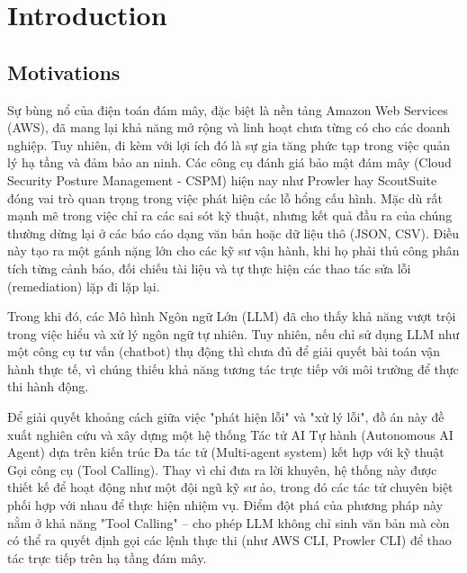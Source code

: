 \chapter{Introduction}

\section{Motivations}
Sự bùng nổ của điện toán đám mây, đặc biệt là nền tảng Amazon Web Services (AWS), đã mang lại khả năng mở rộng và linh hoạt chưa từng có cho các doanh nghiệp. Tuy nhiên, đi kèm với lợi ích đó là sự gia tăng phức tạp trong việc quản lý hạ tầng và đảm bảo an ninh. Các công cụ đánh giá bảo mật đám mây (Cloud Security Posture Management - CSPM) hiện nay như Prowler hay ScoutSuite đóng vai trò quan trọng trong việc phát hiện các lỗ hổng cấu hình. Mặc dù rất mạnh mẽ trong việc chỉ ra các sai sót kỹ thuật, nhưng kết quả đầu ra của chúng thường dừng lại ở các báo cáo dạng văn bản hoặc dữ liệu thô (JSON, CSV). Điều này tạo ra một gánh nặng lớn cho các kỹ sư vận hành, khi họ phải thủ công phân tích từng cảnh báo, đối chiếu tài liệu và tự thực hiện các thao tác sửa lỗi (remediation) lặp đi lặp lại.

Trong khi đó, các Mô hình Ngôn ngữ Lớn (LLM) đã cho thấy khả năng vượt trội trong việc hiểu và xử lý ngôn ngữ tự nhiên. Tuy nhiên, nếu chỉ sử dụng LLM như một công cụ tư vấn (chatbot) thụ động thì chưa đủ để giải quyết bài toán vận hành thực tế, vì chúng thiếu khả năng tương tác trực tiếp với môi trường để thực thi hành động.

Để giải quyết khoảng cách giữa việc "phát hiện lỗi" và "xử lý lỗi", đồ án này đề xuất nghiên cứu và xây dựng một hệ thống Tác tử AI Tự hành (Autonomous AI Agent) dựa trên kiến trúc Đa tác tử (Multi-agent system) kết hợp với kỹ thuật Gọi công cụ (Tool Calling). Thay vì chỉ đưa ra lời khuyên, hệ thống này được thiết kế để hoạt động như một đội ngũ kỹ sư ảo, trong đó các tác tử chuyên biệt phối hợp với nhau để thực hiện nhiệm vụ. Điểm đột phá của phương pháp này nằm ở khả năng "Tool Calling" – cho phép LLM không chỉ sinh văn bản mà còn có thể ra quyết định gọi các lệnh thực thi (như AWS CLI, Prowler CLI) để thao tác trực tiếp trên hạ tầng đám mây.

